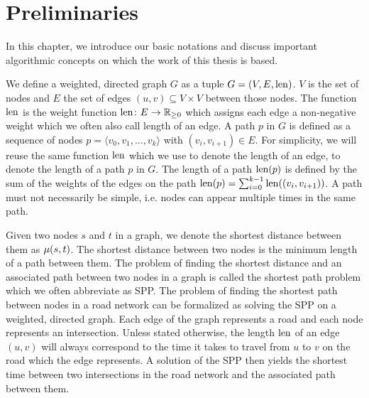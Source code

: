 
\chapter{Preliminaries\label{ch:preliminaries}}
In this chapter, we introduce our basic notations and discuss important algorithmic concepts on which the work of this thesis is based.

We define a weighted, directed graph $G$ as a tuple $G=(V,E,\operatorname{len})$. $V$ is the set of nodes and $E$ the set of edges $(u,v) \subseteq V \times V$ between those nodes. The function $\operatorname{len}$ is the weight function $\operatorname{len}\colon E \rightarrow \mathbb{R}_{\ge 0}$ which assigns each edge a non-negative weight which we often also call length of an edge. A path $p$ in $G$ is defined as a sequence of nodes $p = \langle v_0,v_1,...,v_k \rangle$ with $(v_i,v_{i+1}) \in E$. For simplicity, we will reuse the same function $\operatorname{len}$ which we use to denote the length of an edge, to denote the length of a path $p$ in $G$. The length of a path $\operatorname{len}(p)$ is defined by the sum of the weights of the edges on the path $\operatorname{len}(p) = \sum_{i=0}^{k-1}{\operatorname{len}((v_i,v_{i+1}))}$. A path must not necessarily be simple, i.e. nodes can appear multiple times in the same path.

Given two nodes $s$ and $t$ in a graph, we denote the shortest distance between them as $\mu(s,t)$. The shortest distance between two nodes is the minimum length of a path between them. The problem of finding the shortest distance and an associated path between two nodes in a graph is called the shortest path problem which we often abbreviate as SPP. The problem of finding the shortest path between nodes in a road network can be formalized as solving the SPP on a weighted, directed graph. Each edge of the graph represents a road and each node represents an intersection. Unless stated otherwise, the length $\operatorname{len}$ of an edge $(u,v)$ will always correspond to the time it takes to travel from $u$ to $v$ on the road which the edge represents. A solution of the SPP then yields the shortest time between two intersections in the road network and the associated path between them.

